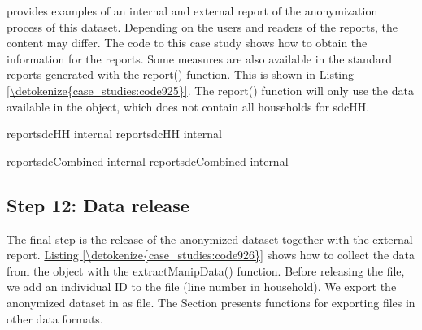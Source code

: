 \documentclass[letterpaper,10pt,english]{sphinxmanual}
\begin{document}
provides examples of an internal and external report of the
anonymization process of this dataset. Depending on the users and
readers of the reports, the content may differ. The code to this case
study shows how to obtain the information for the reports. Some measures
are also available in the standard reports generated with the report()
function. This is shown in \hyperref[\detokenize{case_studies:code925}]{Listing \ref{\detokenize{case_studies:code925}}}. The report() function will only
use the data available in the  object, which does not contain
all households for sdcHH.

\def\sphinxLiteralBlockLabel{\label{\detokenize{case_studies:code925}}}
%
\begin{sphinxVerbatim}[commandchars=\\\{\},numbers=left,firstnumber=1,stepnumber=1]
reportsdcHH internal   
reportsdcHH internal   

reportsdcCombined internal   
reportsdcCombined internal   
\end{sphinxVerbatim}


\subsection{Step 12: Data release}
\label{\detokenize{case_studies:step-12-data-release}}
The final step is the release of the anonymized dataset together with
the external report. \hyperref[\detokenize{case_studies:code926}]{Listing \ref{\detokenize{case_studies:code926}}} shows how to collect the data from the
 object with the extractManipData() function. Before releasing
the file, we add an individual ID to the file (line number in
household). We export the anonymized dataset in as  file. The Section
presents functions for exporting files in other data formats.
\end{document}
